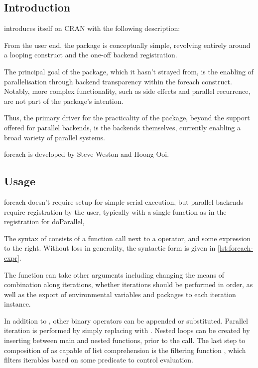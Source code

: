 \subsection{Introduction}\label{sec:foreach-introduction}

 introduces itself on CRAN with the following description:


From the user end, the package is conceptually simple, revolving entirely around a looping construct and the one-off backend registration.

The principal goal of the package, which it hasn't strayed from, is the enabling of parallelisation through backend transparency within the foreach construct.
Notably, more complex functionality, such as side effects and parallel recurrence, are not part of the package's intention.

Thus, the primary driver for the practicality of the package, beyond the support offered for parallel backends, is the backends themselves, currently enabling a broad variety of parallel systems.

foreach is developed by Steve Weston and Hoong Ooi.

\subsection{Usage}\label{sec:usage}

foreach doesn't require setup for simple serial execution, but parallel
backends require registration by the user, typically with a single
function as in the registration for doParallel, 

The syntax of  consists of a  function call next to a  operator, and some expression to the right\cite{weston19:_using}.
Without loss in generality, the syntactic form is given in \cref{lst:foreach-expr}.


The  function can take other arguments including changing the means of combination along iterations, whether iterations should be performed in order, as well as the export of environmental variables and packages to each iteration instance.

In addition to , other binary operators can be appended or substituted.
Parallel iteration is performed by simply replacing  with .
Nested loops can be created by inserting  between main and nested  functions, prior to the  call\cite{weston19:_nestin_loops}.
The last step to composition of  as capable of list comprehension is the filtering function , which filters iterables based on some predicate to control evaluation.

